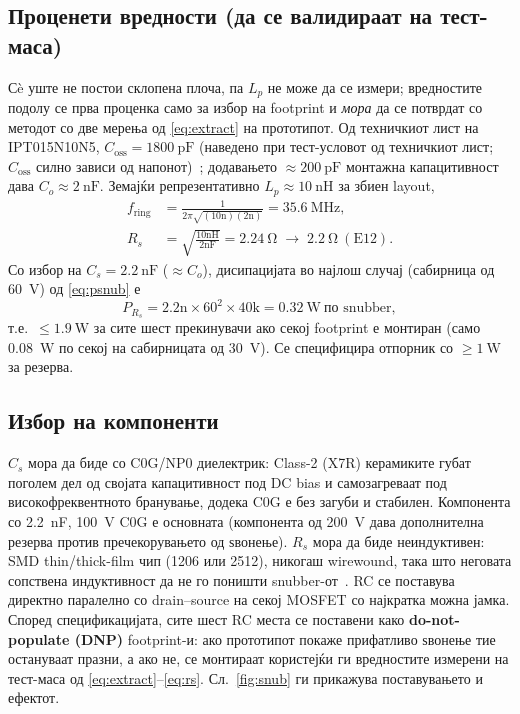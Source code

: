 \documentclass[journal,onecolumn,11pt]{IEEEtran}
\begin{document}
\subsection{Проценети вредности (да се валидираат на тест-маса)}
Сè уште не постои склопена плоча, па \(L_p\) не може да се измери; вредностите подолу се прва проценка
само за избор на footprint и \emph{мора} да се потврдат со методот со две мерења од \eqref{eq:extract}
на прототипот. Од техничкиот лист на IPT015N10N5, \(C_{\mathrm{oss}}=\SI{1800}{\pico\farad}\) (наведено
при тест-условот од техничкиот лист; \(C_{\mathrm{oss}}\) силно зависи од напонот)~\cite{ipt015ds,ipt015part};
додавањето \(\approx\SI{200}{\pico\farad}\) монтажна капацитивност дава \(C_o\approx\SI{2}{\nano\farad}\).
Земајќи репрезентативно \(L_p\approx\SI{10}{\nano\henry}\) за збиен layout,
\begin{align}
f_{\mathrm{ring}}&=\frac{1}{2\pi\sqrt{(10\text{n})(2\text{n})}}=\SI{35.6}{\mega\hertz},\\
R_s&=\sqrt{\frac{10\text{nH}}{2\text{nF}}}=\SI{2.24}{\ohm}\;\to\;\SI{2.2}{\ohm}\ (\text{E12}).
\end{align}
Со избор на \(C_s=\SI{2.2}{\nano\farad}\) (\(\approx C_o\)), дисипацијата во најлош случај (сабирница од
\SI{60}{\volt}) од \eqref{eq:psnub} е
\begin{equation}
P_{R_s}=2.2\text{n}\times 60^{2}\times 40\text{k}=\SI{0.32}{\watt}\ \text{по snubber},
\end{equation}
т.е.\ \(\le\SI{1.9}{\watt}\) за сите шест прекинувачи ако секој footprint е монтиран (само
\SI{0.08}{\watt} по секој на сабирницата од \SI{30}{\volt}). Се специфицира отпорник со
\(\ge\SI{1}{\watt}\) за резерва.

\subsection{Избор на компоненти}
\(C_s\) мора да биде со C0G/NP0 диелектрик: Class-2 (X7R) керамиките губат поголем дел од својата
капацитивност под DC bias и самозагреваат под високофреквентното бранување, додека C0G е без загуби и
стабилен. Компонента со \SI{2.2}{\nano\farad}, \SI{100}{\volt} C0G е основната (компонента од
\SI{200}{\volt} дава дополнителна резерва против пречекорувањето од ѕвонење). \(R_s\) мора да биде
неиндуктивен: SMD thin/thick-film чип (1206 или 2512), никогаш wirewound, така што неговата сопствена
индуктивност да не го поништи snubber-от~\cite{severns}. RC се поставува директно паралелно со
drain--source на секој MOSFET со најкратка можна јамка. Според спецификацијата, сите шест RC места се
поставени како \textbf{do-not-populate (DNP)} footprint-и: ако прототипот покаже прифатливо ѕвонење тие
остануваат празни, а ако не, се монтираат користејќи ги вредностите измерени на тест-маса од
\eqref{eq:extract}--\eqref{eq:rs}. Сл.~\ref{fig:snub} ги прикажува поставувањето и ефектот.
\end{document}
